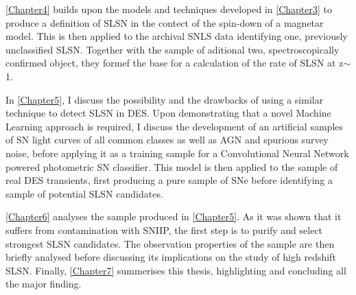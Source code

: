 \cref{Chapter4} builds upon the models and techniques developed in \cref{Chapter3} to produce a definition of SLSN in the contect of the spin-down of a magnetar model. This is then applied to the archival SNLS data identifying one, previously unclassified SLSN. Together with the sample of aditional two, spectroscopically confirmed object, they formef the base for a calculation of the rate of SLSN at z$\sim$1.

In \cref{Chapter5}, I discuss the possibility and the drawbacks of using a similar technique to detect SLSN in DES. Upon demonstrating that a novel Machine Learning approach is required, I discuss the development of an artificial samples of SN light curves of all common classes as well as AGN and spurious survey noise, before applying it as a training sample for a Convolutional Neural Network powered photometric SN classifier. This model is then applied to the sample of real DES transients, first producing a pure sample of SNe before identifying a sample of potential SLSN candidates.

\cref{Chapter6} analyses the sample produced in \cref{Chapter5}. As it was shown that it suffers from contamination with SNIIP, the first step is to purify and select strongest SLSN candidates. The observation properties of the sample are then briefly analysed before discussing its implications on the study of high redshift SLSN. Finally, \cref{Chapter7} summerises this thesis, highlighting and concluding all the major finding.
